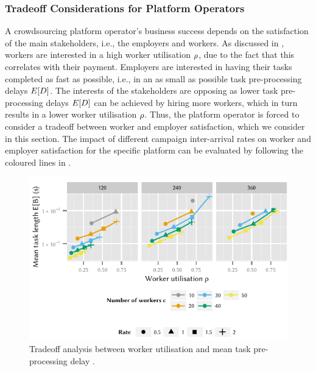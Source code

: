 \subsubsection*{Tradeoff Considerations for Platform Operators}

A crowdsourcing platform operator's business success depends on the satisfaction of the main stakeholders, i.e., the employers and workers.
As discussed in , workers are interested in a high worker utilisation \(\rho\), due to the fact that this correlates with their payment.
Employers are interested in having their tasks completed as fast as possible, i.e., in an as small as possible task pre-processing delays \(E[D]\).
The interests of the stakeholders are opposing as lower task pre-processing delays \(E[D]\) can be achieved by hiring more workers, which in turn results in a lower worker utilisation \(\rho\).
Thus, the platform operator is forced to consider a tradeoff between worker and employer satisfaction, which we consider in this section.
The impact of different campaign inter-arrival rates \campaignIAT on worker and employer satisfaction for the specific platform can be evaluated by following the coloured lines in .

\begin{figure}
	\centering
	\includegraphics{cloud/crowdsourcing/numerical_evaluation/figures/pareto}
	\caption{Tradeoff analysis between worker utilisation \workerUtilization and mean task pre-processing delay \preTaskProcessingDelay.}
	\label{fig:cloud:crowdsourcing:performance_evaluation:tradeoff:pareto}
\end{figure}

